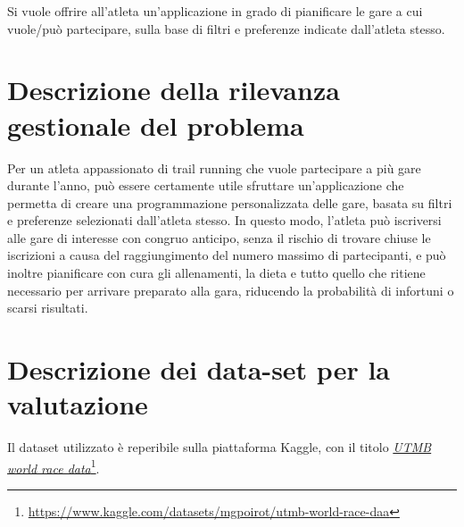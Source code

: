 \documentclass[a4paper, 12pt, oneside]{book}
\begin{document}
Si vuole offrire all'atleta un'applicazione in grado di pianificare le gare a cui vuole/può partecipare, sulla base di filtri e preferenze indicate dall'atleta stesso.

\section{Descrizione della rilevanza gestionale del problema}
Per un atleta appassionato di trail running che vuole partecipare a più gare durante l'anno, può essere certamente utile sfruttare un'applicazione che permetta di creare una programmazione personalizzata delle gare, basata su filtri e preferenze selezionati dall'atleta stesso. In questo modo, l'atleta può iscriversi alle gare di interesse con congruo anticipo, senza il rischio di trovare chiuse le iscrizioni a causa del raggiungimento del numero massimo di partecipanti, e può inoltre pianificare con cura gli allenamenti, la dieta e tutto quello che ritiene necessario per arrivare preparato alla gara, riducendo la probabilità di infortuni o scarsi risultati.

\section{Descrizione dei data-set per la valutazione} \label{sec:descrizione-dataset}
Il dataset utilizzato è reperibile sulla piattaforma Kaggle, con il titolo \href{https://www.kaggle.com/datasets/mgpoirot/utmb-world-race-daa}{\textit{UTMB world race data}}\footnote{\color{blue}\url{https://www.kaggle.com/datasets/mgpoirot/utmb-world-race-daa}}.
\end{document}
